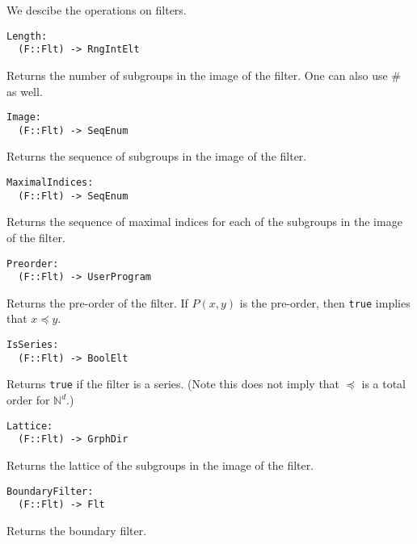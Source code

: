\documentclass{amsart}
\begin{document}
We descibe the operations on filters.

\color{blue}
\begin{verbatim}
Length:
  (F::Flt) -> RngIntElt
\end{verbatim}
\color{black}

Returns the number of subgroups in the image of the filter. One can also use $\#$ as well.

\color{blue}
\begin{verbatim}
Image:
  (F::Flt) -> SeqEnum
\end{verbatim}
\color{black}

Returns the sequence of subgroups in the image of the filter.

\color{blue}
\begin{verbatim}
MaximalIndices:
  (F::Flt) -> SeqEnum
\end{verbatim}
\color{black}

Returns the sequence of maximal indices for each of the subgroups in the image of the filter.

\color{blue}
\begin{verbatim}
Preorder:
  (F::Flt) -> UserProgram
\end{verbatim}
\color{black}

Returns the pre-order of the filter. If $P(x,y)$ is the pre-order, then {\tt true} implies that $x\preceq y$.

\color{blue}
\begin{verbatim}
IsSeries:
  (F::Flt) -> BoolElt
\end{verbatim}
\color{black}

Returns {\tt true} if the filter is a series. (Note this does not imply that $\preceq$ is a total order for $\mathbb{N}^d$.)

\color{blue}
\begin{verbatim}
Lattice:
  (F::Flt) -> GrphDir
\end{verbatim}
\color{black}

Returns the lattice of the subgroups in the image of the filter. 

\color{blue}
\begin{verbatim}
BoundaryFilter:
  (F::Flt) -> Flt
\end{verbatim}
\color{black}

Returns the boundary filter. 
\end{document}
